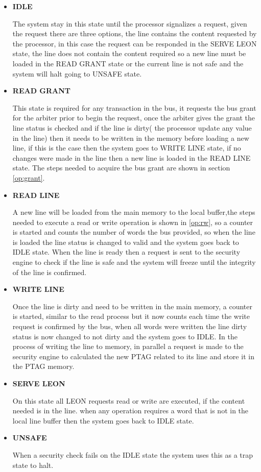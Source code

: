 \begin{itemize}
 \item{\textbf{IDLE}}
 
 The system stay in this state  until the processor signalizes a request, given the request 
 there are three options, the line contains the content requested by the processor, in this case
 the request can be responded in the SERVE LEON state, the line does not contain the content required
 so a new line must be loaded in the READ GRANT state or the current line is not safe and the system will halt
 going to UNSAFE state.
 
  \item{\textbf{READ GRANT}}
  
  This state is required for any transaction in the bus, it requests the bus grant for the arbiter prior to 
  begin the request, once the arbiter gives the grant the line status is checked and if the line is dirty( the processor
  update any value in the line) then it needs to be written in the memory before loading a new line, if this is the case
   then the system goes to WRITE LINE state, if no changes were made in the line then a new line is loaded in the READ LINE 
   state. The steps needed to acquire the bus grant are shown in section \ref{op:grant}.
  
  \item{\textbf{READ LINE}}
  
  
  A new line will be loaded from the main memory to the local buffer,the  steps needed to execute
   a read or write operation is shown  in \ref{op:rw}, so a counter is started and counts the 
  number of words the bus provided, so when the line is loaded the line status is changed to valid and
  the system goes back to IDLE state. When  the line is ready  then a request is sent to the security engine 
  to check if the line is safe and the system will freeze until the integrity of the line is confirmed.

 \item{\textbf{WRITE LINE}}
 
 Once the line is dirty and need to be written in the main memory, a counter is  started, similar to the read process 
 but it now counts each time the write request is confirmed by the bus, when all words were written  the line dirty status 
 is now changed to not dirty and the system goes to IDLE. In the process of writing the line to memory, in parallel a request is made 
 to the security engine to calculated the new PTAG related to its line and store it in the PTAG memory.

 \item{\textbf{SERVE LEON}}

 On this state  all LEON requests  read or write are executed, if the content needed is  in the line. 
 when any operation requires a word  that is not in the local line buffer then the system  goes back to IDLE state.
 
 
 \item{\textbf{UNSAFE}}
 
 
When a security check fails  on the IDLE state the system uses this as a trap state to halt.

\end{itemize}




